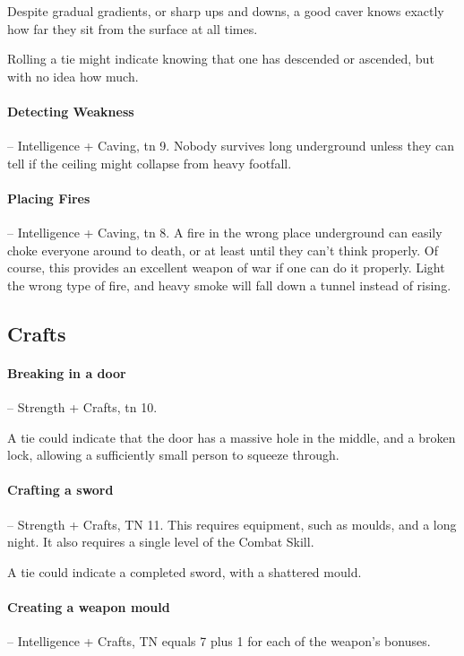\begin{multicols}{2}
Despite gradual gradients, or sharp ups and downs, a good caver knows exactly how far they sit from the surface at all times.

Rolling a tie might indicate knowing that one has descended or ascended, but with no idea how much.

\paragraph{Detecting Weakness} -- Intelligence + Caving, \gls{tn} 9.
Nobody survives long underground unless they can tell if the ceiling might collapse from heavy footfall.

\paragraph{Placing Fires} -- Intelligence + Caving, \gls{tn} 8.
A fire in the wrong place underground can easily choke everyone around to death, or at least until they can't think properly.
Of course, this provides an excellent weapon of war if one can do it properly.
Light the wrong type of fire, and heavy smoke will fall down a tunnel instead of rising.

\subsection{Crafts}

\paragraph{Breaking in a door} -- Strength + Crafts, \gls{tn} 10.

A tie could indicate that the door has a massive hole in the middle, and a broken lock, allowing a sufficiently small person to squeeze through.

\paragraph{Crafting a sword} -- Strength + Crafts, TN 11.
This requires equipment, such as moulds, and a long night.
It also requires a single level of the Combat Skill.

A tie could indicate a completed sword, with a shattered mould.

\paragraph{Creating a weapon mould} -- Intelligence + Crafts, TN equals 7 plus 1 for each of the weapon's bonuses.


\end{multicols}
